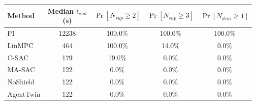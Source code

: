 \begin{tabular}{lcccc}
\toprule
Method & Median $t_{end}$ (s) & $\Pr[N_{sup}\ge2]$ & $\Pr[N_{sup}\ge3]$ & $\Pr[N_{dem}\ge1]$\\
\midrule
PI & 12238 & 100.0\% & 100.0\% & 100.0\%\\
LinMPC & 464 & 100.0\% & 14.0\% & 0.0\%\\
C-SAC & 179 & 19.0\% & 0.0\% & 0.0\%\\
MA-SAC & 122 & 0.0\% & 0.0\% & 0.0\%\\
NoShield & 122 & 0.0\% & 0.0\% & 0.0\%\\
AgentTwin & 122 & 0.0\% & 0.0\% & 0.0\%\\
\bottomrule
\end{tabular}